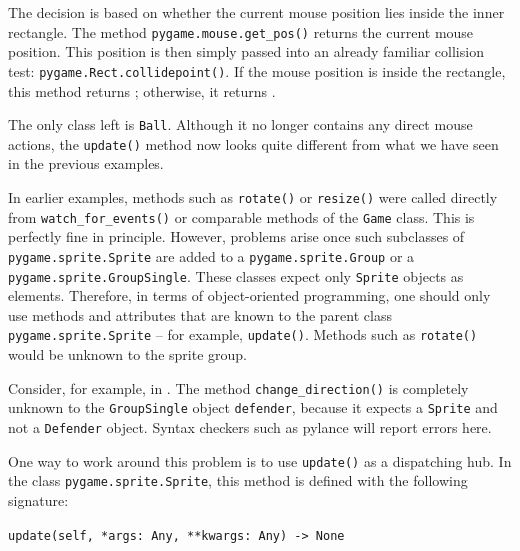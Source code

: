 The decision is based on whether the current mouse position lies inside the inner rectangle. The method \texttt{pygame.mouse.get\_pos()} returns the current mouse position. This position is then simply passed into an already familiar collision test: \texttt{pygame\-.Rect\-.col\-lide\-point()}. If the mouse position is inside the rectangle, this method returns \true; otherwise, it returns \false.


The only class left is \texttt{Ball}. Although it no longer contains any direct mouse actions, the \texttt{update()} method now looks quite different from what we have seen in the previous examples.  

\begin{warningbox}
	In earlier examples, methods such as \texttt{rotate()} or \texttt{resize()} were called directly from \texttt{watch\_for\_events()} or comparable methods of the \texttt{Game} class. This is perfectly fine in principle. However, problems arise once such subclasses of \texttt{pygame.sprite.Sprite} are added to a \texttt{pygame.sprite.Group} or a \texttt{pygame.sprite.GroupSingle}. These classes expect only \texttt{Sprite} objects as elements. Therefore, in terms of object-oriented programming, one should only use methods and attributes that are known to the parent class \texttt{pygame.sprite.Sprite} -- for example, \texttt{update()}.  Methods such as \texttt{rotate()} would be unknown to the sprite group.
\end{warningbox}

Consider, for example,  in . The method \texttt{change\-\_di\-rec\-tion()} is completely unknown to the \texttt{GroupSingle} object \texttt{defender}, because it expects a \texttt{Sprite} and not a \texttt{Defender} object. Syntax checkers such as \gls{pylance} will report errors here.


\begin{hintbox}
	One way to work around this problem is to use \texttt{update()} as a dispatching hub. In the class 		\texttt{pygame.sprite.Sprite}, this method is defined with the following signature:

	\verb+update(self, *args: Any, **kwargs: Any) -> None+
\end{hintbox}


